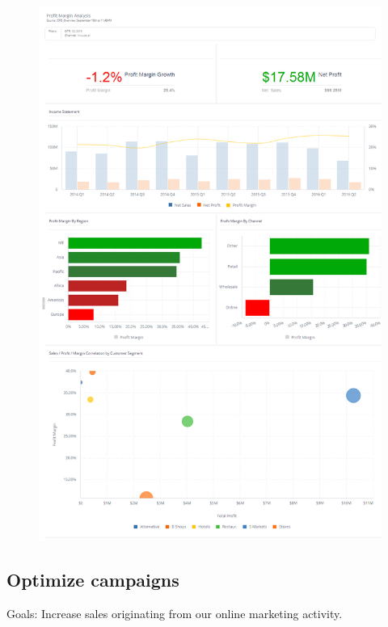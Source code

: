 \documentclass[]{book}
\begin{document}
\begin{figure}
\centering
\includegraphics{increaseprofit.png}
\caption{}
\end{figure}

\subsection{Optimize campaigns}\label{optimize-campaigns}

Goals: Increase sales originating from our online marketing activity.
\end{document}

